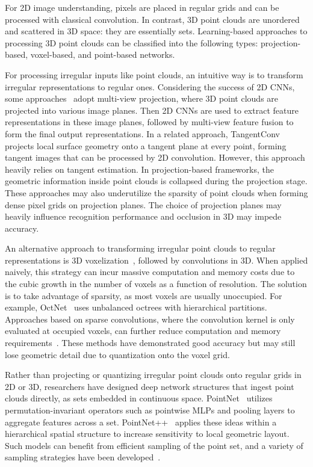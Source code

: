 For 2D image understanding, pixels are placed in regular grids and can be processed with classical convolution. In contrast, 3D point clouds are unordered and scattered in 3D space: they are essentially sets. Learning-based approaches to processing 3D point clouds can be classified into the following types: projection-based, voxel-based, and point-based networks.

For processing irregular inputs like point clouds, an intuitive way is to transform irregular representations to regular ones. Considering the success of 2D CNNs, some approaches~\cite{su15mvcnn,li2016vehicle,chen2017multi,kanezaki2018rotationnet,lang2019pointpillars} adopt multi-view projection, where 3D point clouds are projected into various image planes. Then 2D CNNs are used to extract feature representations in these image planes, followed by multi-view feature fusion to form the final output representations. In a related approach, TangentConv~\cite{tatarchenko2018tangent} projects local surface geometry onto a tangent plane at every point, forming tangent images that can be processed by 2D convolution. However, this approach heavily relies on tangent estimation. In projection-based frameworks, the geometric information inside point clouds is collapsed during the projection stage. These approaches may also underutilize the sparsity of point clouds when forming dense pixel  grids on projection planes. The choice of projection planes may heavily influence recognition performance and occlusion in 3D may impede accuracy.

An alternative approach to transforming irregular point clouds to regular representations is 3D voxelization~\cite{maturana2015voxnet,song2016ssc}, followed by convolutions in 3D. When applied naively, this strategy can incur massive computation and memory costs due to the cubic growth in the number of voxels as a function of resolution. The solution is to take advantage of sparsity, as most voxels are usually unoccupied. For example, OctNet~\cite{riegler2017octnet} uses unbalanced octrees with hierarchical partitions. Approaches based on sparse convolutions, where the convolution kernel is only evaluated at occupied voxels, can further reduce computation and memory requirements~\cite{graham20183d,choy20194d}. These methods have demonstrated good accuracy but may still lose geometric detail due to quantization onto the voxel grid.

Rather than projecting or quantizing irregular point clouds onto regular grids in 2D or 3D, researchers have designed deep network structures that ingest point clouds directly, as sets embedded in continuous space.
PointNet~\cite{qi2017pointnet} utilizes permutation-invariant operators such as pointwise MLPs and pooling layers to aggregate features across a set. PointNet++~\cite{qi2017pointnet2} applies these ideas within a hierarchical spatial structure to increase sensitivity to local geometric layout.
Such models can benefit from efficient sampling of the point set, and a variety of sampling strategies have been developed~\cite{qi2017pointnet2,dovrat2019learning,wu2019pointconv,yang2019modeling,hu2020randla}.

